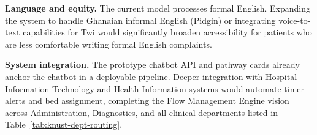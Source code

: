 \textbf{Language and equity.} The current model processes formal English. Expanding the system to handle Ghanaian informal English (Pidgin) or integrating voice-to-text capabilities for Twi would significantly broaden accessibility for patients who are less comfortable writing formal English complaints.

\textbf{System integration.} The prototype chatbot API and pathway cards already anchor the chatbot in a deployable pipeline. Deeper integration with Hospital Information Technology and Health Information systems would automate timer alerts and bed assignment, completing the Flow Management Engine vision across Administration, Diagnostics, and all clinical departments listed in Table~\ref{tab:knust-dept-routing}.
